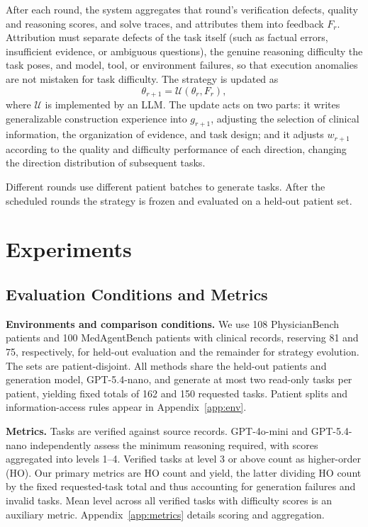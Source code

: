 \documentclass[11pt]{article}
\begin{document}
After each round, the system aggregates that round's verification defects, quality and reasoning scores, and solve traces, and attributes them into feedback $F_r$. Attribution must separate defects of the task itself (such as factual errors, insufficient evidence, or ambiguous questions), the genuine reasoning difficulty the task poses, and model, tool, or environment failures, so that execution anomalies are not mistaken for task difficulty. The strategy is updated as
\begin{equation}
\theta_{r+1}=\mathcal{U}(\theta_r,F_r),
\end{equation}
where $\mathcal{U}$ is implemented by an LLM. The update acts on two parts: it writes generalizable construction experience into $g_{r+1}$, adjusting the selection of clinical information, the organization of evidence, and task design; and it adjusts $w_{r+1}$ according to the quality and difficulty performance of each direction, changing the direction distribution of subsequent tasks.

Different rounds use different patient batches to generate tasks. After the scheduled rounds the strategy is frozen and evaluated on a held-out patient set.

\section{Experiments}

\subsection{Evaluation Conditions and Metrics}

\textbf{Environments and comparison conditions.} We use 108 PhysicianBench patients and 100 MedAgentBench patients with clinical records, reserving 81 and 75, respectively, for held-out evaluation and the remainder for strategy evolution. The sets are patient-disjoint. All methods share the held-out patients and generation model, GPT-5.4-nano, and generate at most two read-only tasks per patient, yielding fixed totals of 162 and 150 requested tasks. Patient splits and information-access rules appear in Appendix~\ref{app:env}.

\textbf{Metrics.} Tasks are verified against source records. GPT-4o-mini and GPT-5.4-nano independently assess the minimum reasoning required, with scores aggregated into levels 1--4. Verified tasks at level 3 or above count as higher-order (HO). Our primary metrics are HO count and yield, the latter dividing HO count by the fixed requested-task total and thus accounting for generation failures and invalid tasks. Mean level across all verified tasks with difficulty scores is an auxiliary metric. Appendix~\ref{app:metrics} details scoring and aggregation.
\end{document}
